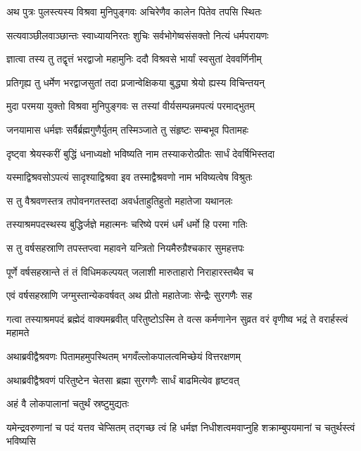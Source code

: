 
\twolineshloka
{अथ पुत्रः पुलस्त्यस्य विश्रवा मुनिपुङ्गवः}
{अचिरेणैव कालेन पितेव तपसि स्थितः} %

\twolineshloka
{सत्यवाञ्छीलवाञ्छान्तः स्वाध्यायनिरतः शुचिः}
{सर्वभोगेष्वसंसक्तो नित्यं धर्मपरायणः} %

\twolineshloka
{ज्ञात्वा तस्य तु तद्वृत्तं भरद्वाजो महामुनिः}
{ददौ विश्रवसे भार्यां स्वसुतां देववर्णिनीम्} %

\twolineshloka
{प्रतिगृह्य तु धर्मेण भरद्वाजसुतां तदा}
{प्रजान्वेक्षिकया बुद्ध्या श्रेयो ह्यस्य विचिन्तयन्} %

\twolineshloka
{मुदा परमया युक्तो विश्रवा मुनिपुङ्गवः}
{स तस्यां वीर्यसम्पन्नमपत्यं परमाद्भुतम्} %

\twolineshloka
{जनयामास धर्मज्ञः सर्वैर्ब्रह्मगुणैर्युतम्}
{तस्मिञ्जाते तु संहृष्टः सम्बभूव पितामहः} %

\twolineshloka
{दृष्ट्वा श्रेयस्करीं बुद्धिं धनाध्यक्षो भविष्यति}
{नाम तस्याकरोत्प्रीतः सार्धं देवर्षिभिस्तदा} %

\twolineshloka
{यस्माद्विश्रवसोऽपत्यं सादृश्याद्विश्रवा इव}
{तस्माद्वैश्रवणो नाम भविष्यत्वेष विश्रुतः} %

\twolineshloka
{स तु वैश्रवणस्तत्र तपोवनगतस्तदा}
{अवर्धताहुतिहुतो महातेजा यथानलः} %

\twolineshloka
{तस्याश्रमपदस्थस्य बुद्धिर्जज्ञे महात्मनः}
{चरिष्ये परमं धर्मं धर्मो हि परमा गतिः} %

\twolineshloka
{स तु वर्षसहस्राणि तपस्तप्त्वा महावने}
{यन्त्रितो नियमैरुग्रैश्चकार सुमहत्तपः} %

\twolineshloka
{पूर्णे वर्षसहस्रान्ते तं तं विधिमकल्पयत्}
{जलाशी मारुताहारो निराहारस्तथैव च} %

\twolineshloka
{एवं वर्षसहस्राणि जग्मुस्तान्येकवर्षवत्}
{अथ प्रीतो महातेजाः सेन्द्रैः सुरगणैः सह} %

\threelineshloka
{गत्वा तस्याश्रमपदं ब्रह्मेदं वाक्यमब्रवीत्}
{परितुष्टोऽस्मि ते वत्स कर्मणानेन सुव्रत}
{वरं वृणीष्व भद्रं ते वरार्हस्त्वं महामते} %

\twolineshloka
{अथाब्रवीद्वैश्रवणः पितामहमुपस्थितम्}
{भगवँल्लोकपालत्वमिच्छेयं वित्तरक्षणम्} %

\twolineshloka
{अथाब्रवीद्वैश्रवणं परितुष्टेन चेतसा}
{ब्रह्मा सुरगणैः सार्धं बाढमित्येव हृष्टवत्} %

\onelineshloka
{अहं वै लोकपालानां चतुर्थं स्रष्टुमुद्यतः} %

\threelineshloka
{यमेन्द्रवरुणानां च पदं यत्तव चेप्सितम्}
{तद्गच्छ त्वं हि धर्मज्ञ निधीशत्वमवाप्नुहि}
{शक्राम्बुपयमानां च चतुर्थस्त्वं भविष्यसि} %

